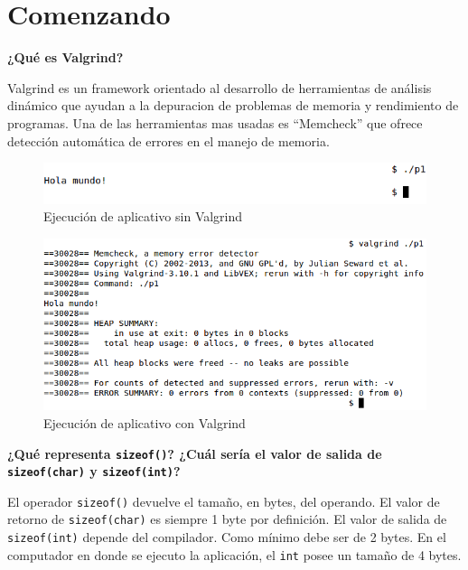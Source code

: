 \documentclass{article}
\begin{document}
\section{Comenzando}

\textbf{¿Qué es Valgrind?}\newline
   
   Valgrind es un framework orientado al desarrollo de herramientas de análisis dinámico que ayudan a la depuracion de problemas de memoria y rendimiento de programas. Una de las herramientas mas usadas es ``Memcheck'' que ofrece detección automática de errores en el manejo de memoria.
    
    \begin{figure}[H]
        \includegraphics[width=\columnwidth]{p1_svalgrind}
        \caption{Ejecución de aplicativo sin Valgrind}
    \end{figure}
    
     \begin{figure}[H]
        \includegraphics[width=\columnwidth]{p1_valgrind}
        \caption{Ejecución de aplicativo con Valgrind}
    \end{figure}
    
\textbf{¿Qué representa \texttt{sizeof()}? ¿Cuál sería el valor de salida de \texttt{sizeof(char)} y \texttt{sizeof(int)}?}\newline
    
    El operador \texttt{sizeof()} devuelve el tamaño, en bytes, del operando. El valor de retorno de \texttt{sizeof(char)} es siempre 1 byte por definición. El valor de salida de \texttt{sizeof(int)} depende del compilador. Como mínimo debe ser de 2 bytes. En el computador en donde se ejecuto la aplicación, el \texttt{int} posee un tamaño de 4 bytes. \newline
\end{document}
